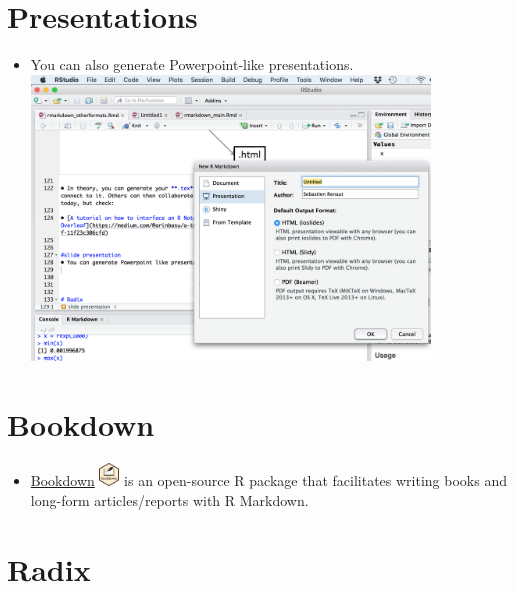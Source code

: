 \documentclass[]{article}
\providecommand{\tightlist}{%
  \setlength{\itemsep}{0pt}\setlength{\parskip}{0pt}}
\begin{document}
\hypertarget{presentations}{%
\section{Presentations}\label{presentations}}

\begin{itemize}
\tightlist
\item
  You can also generate Powerpoint-like presentations.\\
  \includegraphics[width=4.16667in,height=\textheight]{../figures/slides.png}
\end{itemize}

\hypertarget{bookdown}{%
\section{Bookdown}\label{bookdown}}

\begin{itemize}
\tightlist
\item
  \href{https://bookdown.org/}{Bookdown}
  \includegraphics[width=0.20833in,height=\textheight]{../figures/bookdown.png}
  is an open-source R package that facilitates writing books and
  long-form articles/reports with R Markdown.
\end{itemize}

\hypertarget{radix}{%
\section{Radix}\label{radix}}
\end{document}
